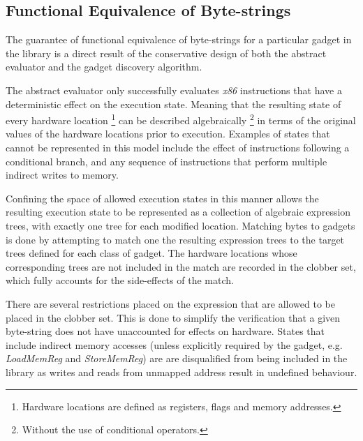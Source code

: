     \subsection{Functional Equivalence of Byte-strings}
    \label{sec:results-gadget-inst-eq}


        The guarantee of functional equivalence of byte-strings for a
        particular gadget in the library is a direct result of the
        conservative design of both the abstract evaluator and the gadget
        discovery algorithm.

        The abstract evaluator only successfully evaluates \emph{x86} instructions
        that have a deterministic effect on the execution state.  Meaning
        that the resulting state of every hardware location
        \footnote{Hardware locations are defined as registers, flags and
        memory addresses.} can be described algebraically \footnote{Without
        the use of conditional operators.} in terms of the original values
        of the hardware locations prior to execution. Examples of states
        that cannot be represented in this model include the effect of
        instructions following a conditional branch, and any sequence of
        instructions that perform multiple indirect writes to memory.

        Confining the space of allowed execution states in this manner
        allows the resulting execution state to be represented as a
        collection of algebraic expression trees, with exactly one tree for
        each modified location. Matching bytes to gadgets is done by
        attempting to match one the resulting expression trees to the target
        trees defined for each class of gadget. The hardware locations whose
        corresponding trees are not included in the match are recorded in
        the clobber set, which fully accounts for the side-effects of the
        match.

        There are several restrictions placed on the expression that are
        allowed to be placed in the clobber set. This is done to simplify
        the verification that a given byte-string does not have unaccounted
        for effects on hardware. States that include indirect memory
        accesses (unless explicitly required by the gadget, e.g.
        \emph{LoadMemReg} and \emph{StoreMemReg}) are are disqualified from
        being included in the library as writes and reads from unmapped
        address result in undefined behaviour.
        
